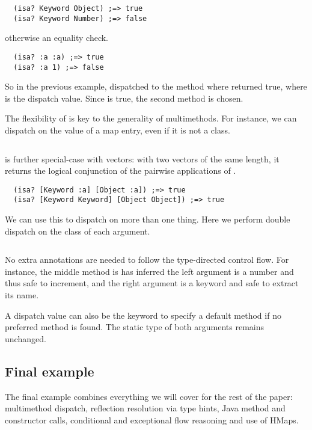\begin{verbatim}
  (isa? Keyword Object) ;=> true
  (isa? Keyword Number) ;=> false
\end{verbatim}

otherwise an equality check.

\begin{verbatim}
  (isa? :a :a) ;=> true
  (isa? :a 1) ;=> false
\end{verbatim}

So in the previous example,  dispatched to the method
where  returned true, where  is the dispatch value.
Since  is true, the second method is chosen.

The flexibility of  is key to the generality of multimethods. 
For instance, we can dispatch on the value of
a map entry, even if it is not a class.

\inputminted[firstline=4,lastline=23]{clojure}{code/demo/src/demo/eg5.clj}

 is further special-case with vectors: with two vectors of the
same length, it returns the logical conjunction of the pairwise applications
of .

\begin{verbatim}
  (isa? [Keyword :a] [Object :a]) ;=> true
  (isa? [Keyword Keyword] [Object Object]) ;=> true
\end{verbatim}

We can use this to dispatch on more than one thing. Here we perform
double dispatch on the class of each argument.

\inputminted[firstline=6,lastline=23]{clojure}{code/demo/src/demo/eg7.clj}

No extra annotations are needed to follow the type-directed control flow.
For instance, the middle method is has inferred the left argument is a number
and thus safe to increment, and the right argument is a keyword and safe to
extract its name.

A dispatch value can also be the keyword  to specify a default
method if no preferred method is found. The static type of both arguments
remains unchanged.

\subsection{Final example}

The final example combines everything we will cover for the rest of the paper:
multimethod dispatch, reflection resolution via type hints, Java method
and constructor calls, conditional and exceptional flow reasoning
and use of HMaps.

